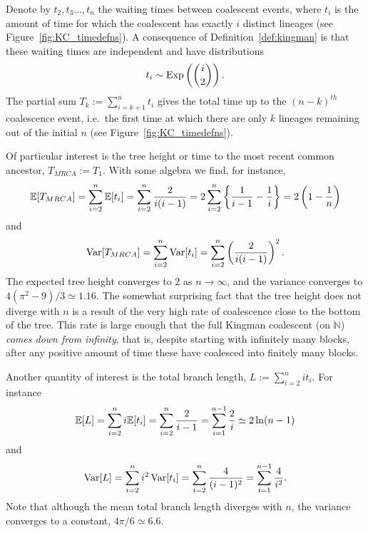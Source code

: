 Denote by $t_2, t_3 \dots, t_n$ the waiting times between coalescent events, where $t_i$ is the amount of time for which the coalescent has exactly $i$ distinct lineages (see Figure~\ref{fig:KC_timedefns}).
A consequence of Definition~\ref{def:kingman} is that these waiting times are independent and have distributions
\begin{equation}
t_i \sim \operatorname{Exp}\left( \binom{i}{2} \right) .
\end{equation}
The partial sum $T_k := \sum_{i=k+1}^n t_i$ gives the total time up to the $(n-k)^{th}$ coalescence event, i.e.\ the first time at which there are only $k$ lineages remaining out of the initial $n$ (see Figure~\ref{fig:KC_timedefns}).

Of particular interest is the tree height or time to the most recent common ancestor, $T_{MRCA} := T_1$.
With some algebra we find, for instance,
\begin{equation}
\mathbb{E}[ T_{MRCA} ] 
= \sum_{i=2}^{n} \mathbb{E}[t_i]
= \sum_{i=2}^n \frac{2}{i(i-1)}
= 2 \sum_{i=2}^n \left\{ \frac{1}{i-1} - \frac{1}{i} \right\}
= 2 \left( 1 - \frac{1}{n} \right)
\end{equation}
and
\begin{equation}
\operatorname{Var}[ T_{MRCA} ] 
= \sum_{i=2}^n \operatorname{Var}[t_i]
= \sum_{i=2}^n \left( \frac{2}{i(i-1)} \right)^2 .
\end{equation}
The expected tree height converges to 2 as $n\to\infty$, and the variance converges to $4(\pi^2 - 9)/3 \simeq 1.16$.
The somewhat surprising fact that the tree height does not diverge with $n$ is a result of the very high rate of coalescence close to the bottom of the tree. This rate is large enough that the full Kingman coalescent (on $\mathbb{N}$) \emph{comes down from infinity}, that is, despite starting with infinitely many blocks, after any positive amount of time these have coalesced into finitely many blocks.

Another quantity of interest is the total branch length,
$ L := \sum_{i=2}^n i t_i $.
For instance
\begin{equation}
\E[ L ] 
= \sum_{i=2}^n i \E[ t_i ]
= \sum_{i=2}^n \frac{2}{i-1}
= \sum_{i=1}^{n-1} \frac{2}{i} %
\simeq 2 \ln(n-1) 
\end{equation}
and
\begin{equation}
\operatorname{Var}[ L ] 
= \sum_{i=2}^n i^2 \operatorname{Var}[ t_i ]
= \sum_{i=2}^n \frac{4}{(i-1)^2}
= \sum_{i=1}^{n-1} \frac{4}{i^2} .
\end{equation}
Note that although the mean total branch length diverges with $n$, the variance converges to a constant, $4\pi /6 \simeq 6.6$.


